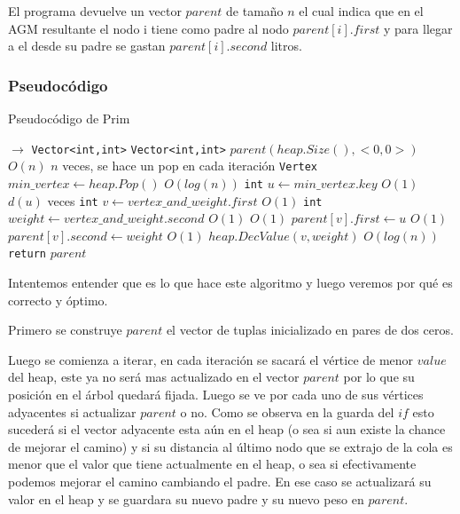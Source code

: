 El programa devuelve un vector $parent$ de tamaño $n$ el cual indica que en el AGM resultante el nodo i tiene como padre al nodo $parent[i].first$ y para llegar a el desde su padre se gastan $parent[i].second$ litros.

\subsubsection{Pseudocódigo}

\begin{algorithm}[H]
  \begin{algorithmic}[1]
  \caption{Pseudocódigo de Prim}
  \label{algo:2-2}
     $\rightarrow$ \texttt{Vector<int,int>}
    	\State \texttt{Vector<int,int>} $parent(heap.Size(), <0,0>)$
    	\Comment $O(n)$
    		\Comment $n$ veces, se hace un pop en cada iteración
    		\State \texttt{Vertex} $min\_vertex \gets heap.Pop()$
    		\Comment $O(log(n))$
    		\State \texttt{int} $ u \gets min\_vertex.key$
    		\Comment $O(1)$
    		\Comment $d(u)$ veces
	    		\State \texttt{int} $ v \gets vertex\_and\_weight.first$
	    		\Comment $O(1)$    			
	    		\State \texttt{int} $ weight \gets vertex\_and\_weight.second$
	    		\Comment $O(1)$    			
    			\Comment $O(1)$
    				\State $parent[v].first \gets u$
    				\Comment $O(1)$
    				\State $parent[v].second \gets weight$
    				\Comment $O(1)$
    				\State $heap.DecValue(v, weight)$
    				\Comment $O(log(n))$
    			\EndIf
    		\EndFor
    	\EndWhile
    	\State \texttt{return} $parent$
		\EndProcedure
	\end{algorithmic}
\end{algorithm}

Intentemos entender que es lo que hace este algoritmo y luego veremos por qué es correcto y óptimo.

Primero se construye $parent$ el vector de tuplas inicializado en pares de dos ceros. 

Luego se comienza a iterar, en cada iteración se sacará el v\'ertice de menor $value$ del heap, este ya no será mas actualizado en el vector $parent$ por lo que su posición en el árbol quedará fijada. Luego se ve por cada uno de sus v\'ertices adyacentes si actualizar $parent$ o no. Como se observa en la guarda del $if$ esto sucederá si el vector adyacente esta aún en el heap (o sea si aun existe la chance de mejorar el camino) y si su distancia al último nodo que se extrajo de la cola es menor
que el valor que tiene actualmente en el heap, o sea si efectivamente podemos mejorar el camino cambiando el padre. En ese caso se actualizará su valor en el heap y se guardara su nuevo padre y su nuevo peso en $parent$.

